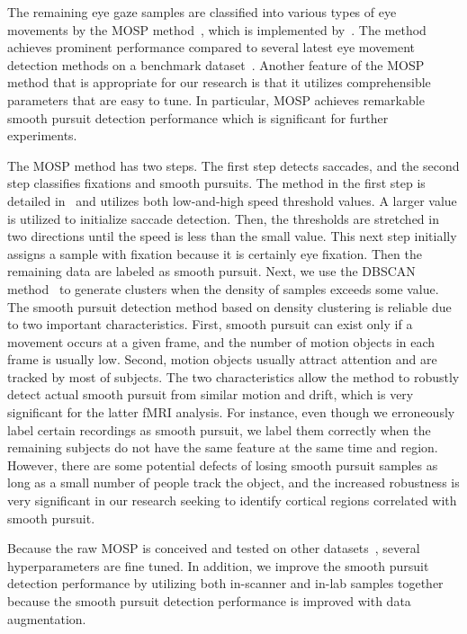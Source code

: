 \documentclass[final,3p,times,twocolumn]{elsarticle}
\begin{document}
The remaining eye gaze samples are classified into various types of eye movements by the MOSP method~\cite{mosp},
which is implemented by~\cite{mosp_imp}.
The method achieves prominent performance compared to several latest eye movement detection methods on a benchmark dataset~\cite{fix_sp_detection, eye_move_det}. 
Another feature of the MOSP method that is appropriate for our research is that it utilizes comprehensible parameters that are easy to tune.
In particular, MOSP achieves remarkable smooth pursuit detection performance which is significant for further experiments. 

The MOSP method has two steps.
The first step detects saccades, 
and the second step classifies fixations and smooth pursuits. 
The method in the first step is detailed in~\cite{dorr2010variability} and utilizes both low-and-high speed threshold values. 
A larger value is utilized to initialize saccade detection.
Then, the thresholds are stretched in two directions until the speed is less than the small value. 
This next step initially assigns a sample with fixation because it is certainly eye fixation. 
Then the remaining data are labeled as smooth pursuit. 
Next, we use the DBSCAN method~\cite{1996A} to generate clusters when the density of samples exceeds some value. 
The smooth pursuit detection method based on density clustering is reliable due to two important characteristics. 
First, smooth pursuit can exist only if a movement occurs at a given frame, 
and the number of motion objects in each frame is usually low. 
Second, motion objects usually attract attention and are tracked by most of subjects. 
The two characteristics allow the method to robustly detect actual smooth pursuit from similar motion and drift, 
which is very significant for the latter fMRI analysis.
For instance, even though we erroneously label certain recordings as smooth pursuit, we label them correctly when the remaining subjects do not have the same feature at the same time and region. 
However, there are some potential defects of losing smooth pursuit samples as long as a small number of people track the object, and the increased robustness is very significant in our research seeking to identify cortical regions correlated with smooth pursuit. 

Because the raw MOSP is conceived and tested on other datasets~\cite{dorr2010variability}, several hyperparameters are fine tuned. 
In addition, we improve the smooth pursuit detection performance by utilizing both in-scanner and in-lab samples together because the smooth pursuit detection performance is improved with data augmentation. 
\end{document}
